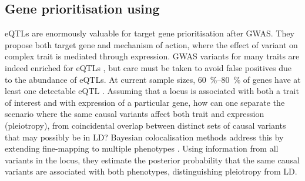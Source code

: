\begin{outline}
\subsection{Gene prioritisation using }
\label{subsec:intro_genePrioritisationUsingeQTL}

\glspl{eQTL} are enormously valuable for target gene prioritisation after \gls{GWAS}.
They propose both target gene and mechanism of action, where the effect of variant on complex trait is mediated through expression.
\Gls{GWAS} variants for many traits are indeed enriched for \glspl{eQTL} \autocite{nicolae2010TraitAssociatedSNPsAre}, but care must be taken to avoid false positives due to the abundance of \glspl{eQTL}.
At current sample sizes, \SIrange{60}{80}{\percent} of genes have at least one detectable \gls{eQTL} \autocite{vandiedonck2017GeneticAssociationMolecular,vosa2018UnravelingPolygenicArchitecture}.
Assuming that a locus is associated with both a trait of interest and with expression of a particular gene,
how can one separate the scenario where the same causal variants affect both trait and expression (pleiotropy),
from coincidental overlap between distinct sets of causal variants that may possibly be in \gls{LD}?
Bayesian colocalisation methods address this by extending fine-mapping to multiple phenotypes \autocite{burgess2018InferringCausalRelationships,wallace2020ElicitingPriorsRelaxing,hukku2020ProbabilisticColocalizationGenetic}.
Using information from all variants in the locus, 
they estimate the posterior probability that the same causal variants are associated with both phenotypes,
distinguishing pleiotropy from \gls{LD}.


\end{outline}
